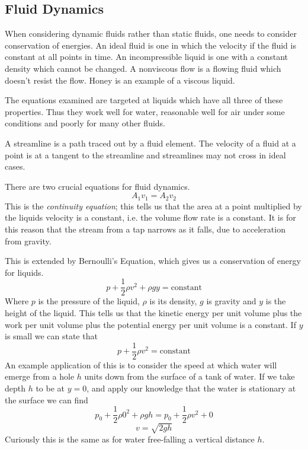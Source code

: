\documentclass[12pt]{report}
\begin{document}
\begin{flushleft}
\subsection*{Fluid Dynamics}

When considering dynamic fluids rather than static fluids, one needs to
consider conservation of energies. An ideal fluid is one in which the velocity
if the fluid is constant at all points in time. An incompressible liquid is one
with a constant density which cannot be changed. A nonviscous flow is a flowing
fluid which doesn't resist the flow. Honey is an example of a viscous liquid.
\par
The equations examined are targeted at liquids which have all three of these
properties. Thus they work well for water, reasonable well for air under some
conditions and poorly for many other fluids. \par
A streamline is a path traced out by a fluid element. The velocity of a fluid
at a point is at a tangent to the streamline and streamlines may not cross in
ideal cases. \par
There are two crucial equations for fluid dynamics.
\[A_1v_1 = A_2v_2\]
This is the \textit{continuity equation}; this tells us that the area at a
point multiplied by the liquids velocity is a constant, i.e. the volume flow
rate is a constant. It is for this reason that the stream from a tap narrows as
it falls, due to acceleration from gravity. \par
This is extended by Bernoulli's Equation, which gives us a conservation of
energy for liquids.
\[p + \frac{1}{2}\rho v^2 + \rho gy = \mathrm{constant}\]
Where \(p\) is the pressure of the liquid, \(\rho\) is its density, \(g\) is
gravity and \(y\) is the height of the liquid. This tells us that the kinetic
energy per unit volume plus the work per unit volume plus the potential energy
per unit volume is a constant. If \(y\) is small we can state that
\[p + \frac{1}{2}\rho v^2 = \mathrm{constant}\]
An example application of this is to consider the speed at which water will
emerge from a hole \(h\) units down from the surface of a tank of water. If we
take depth \(h\) to be at \(y = 0\), and apply our knowledge that the water is
stationary at the surface we can find
\[p_0 + \frac{1}{2}\rho0^2 + \rho gh = p_0 + \frac{1}{2}\rho v^2 + 0\]
\[v = \sqrt{2gh}\]
Curiously this is the same as for water free-falling a vertical distance \(h\).

\end{flushleft}
\end{document}
